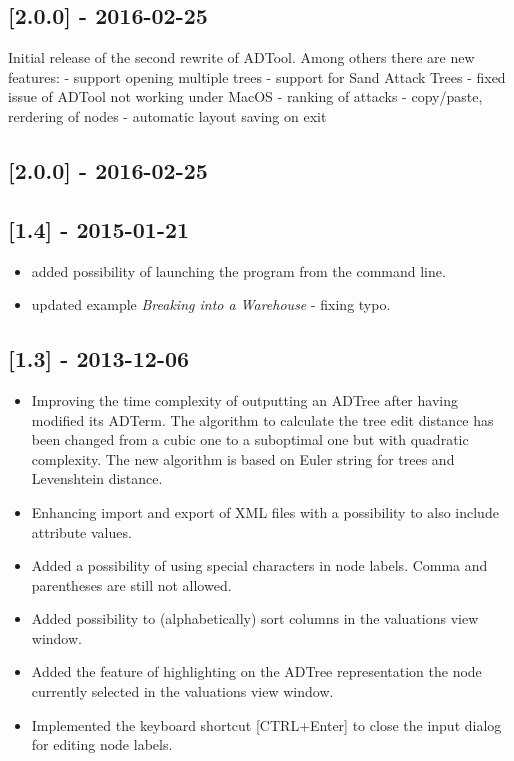 \subsection{{[}2.0.0{]} - 2016-02-25}\label{section-5}

Initial release of the second rewrite of ADTool. Among others there are
new features: - support opening multiple trees - support for Sand Attack
Trees - fixed issue of ADTool not working under MacOS - ranking of
attacks - copy/paste, rerdering of nodes - automatic layout saving on
exit

\subsection{{[}2.0.0{]} - 2016-02-25}\label{section-6}

\subsection{{[}1.4{]} - 2015-01-21}\label{section-7}

\begin{itemize}
\tightlist
\item
  added possibility of launching the program from the command line.
\item
  updated example \emph{Breaking into a Warehouse} - fixing typo.
\end{itemize}

\subsection{{[}1.3{]} - 2013-12-06}\label{section-8}

\begin{itemize}
\tightlist
\item
  Improving the time complexity of outputting an ADTree after having
  modified its ADTerm. The algorithm to calculate the tree edit distance
  has been changed from a cubic one to a suboptimal one but with
  quadratic complexity. The new algorithm is based on Euler string for
  trees and Levenshtein distance.
\item
  Enhancing import and export of XML files with a possibility to also
  include attribute values.
\item
  Added a possibility of using special characters in node labels. Comma
  and parentheses are still not allowed.
\item
  Added possibility to (alphabetically) sort columns in the valuations
  view window.
\item
  Added the feature of highlighting on the ADTree representation the
  node currently selected in the valuations view window.
\item
  Implemented the keyboard shortcut {[}CTRL+Enter{]} to close the input
  dialog for editing node labels.
\end{itemize}


